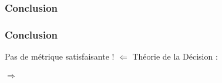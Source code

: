 
\begin{frame}
  \frametitle{Conclusion}
\end{frame}

\begin{frame}
  \frametitle{Conclusion}
  \begin{center}
    Pas de métrique satisfaisante ! $\Leftarrow$ Théorie de la Décision : \\
    $\;$ \\
     \\
    $\Rightarrow$ \\
  \end{center}
\end{frame}
